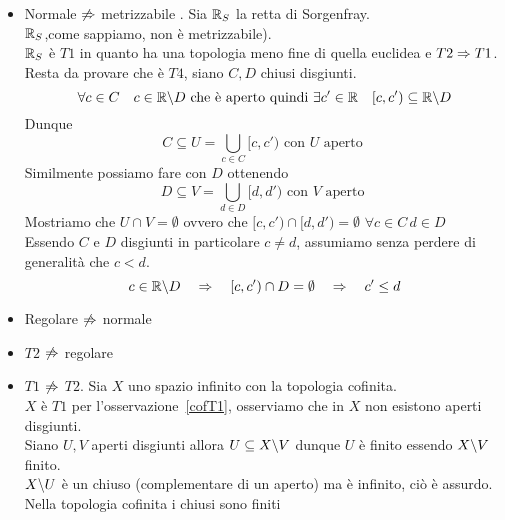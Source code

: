 \begin{itemize}

\item Normale $\not \Rightarrow$ metrizzabile . Sia $\mathbb{R}_S$ la retta di Sorgenfray.\\
$\mathbb{R}_S$,come sappiamo,  non \`e metrizzabile).\\
$\mathbb{R}_S$ \`e $T1$ in quanto ha una topologia meno fine di quella euclidea e $T2\Rightarrow T1$.\\
Resta da provare che \`e $T4$, siano $C,D$ chiusi disgiunti.
$$ \forall c \in C \quad c \in \mathbb{R}\backslash D \text{ che \`e aperto quindi } \exists c' \in \mathbb{R} \quad [c,c') \subseteq \mathbb{R} \backslash D $$
Dunque 
$$ C \subseteq U = \bigcup_{c\in C} [c,c') \text{ con } U \text{ aperto }$$
Similmente possiamo fare con $D$ ottenendo
$$ D\subseteq V = \bigcup_{d\in D} [d,d') \text{ con } V \text{ aperto }$$
Mostriamo che $U \cap V = \emptyset$ ovvero che $[c,c')\cap [d,d') = \emptyset$ $\forall c \in C \, d\in D$\\
Essendo $C$ e $ D$ disgiunti in particolare $c\neq d$, assumiamo senza perdere di generalit\`a che $c<d$.
$$ c \in \mathbb{R} \backslash D \quad \Rightarrow \quad [c,c') \cap D = \emptyset \quad \Rightarrow \quad c ' \leq d $$ 

\item Regolare $\not \Rightarrow$ normale
\item $T2$  $\not \Rightarrow$ regolare
\item $T1$   $\not \Rightarrow$ $T2$. Sia $X$ uno spazio infinito con la topologia cofinita.\\
$X$ \`e $T1$ per l'osservazione~\ref{cofT1}, osserviamo che in $X$ non esistono aperti disgiunti.\\
Siano $U,V$ aperti disgiunti allora $U\subseteq X\backslash V$ dunque $U$ \`e finito essendo $X\backslash V$ finito.\\
 $X\backslash U$ \`e un chiuso (complementare di un aperto) ma \`e infinito, ci\`o \`e assurdo.\\
Nella topologia cofinita i chiusi sono finiti 

\end{itemize}





